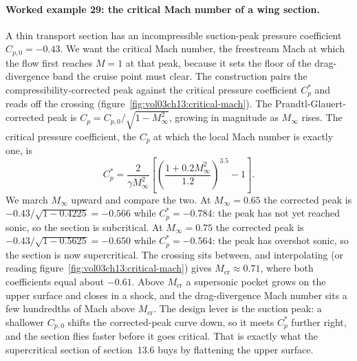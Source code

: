 \paragraph{Worked example 29: the critical Mach number of a wing
section.} A thin transport section has an incompressible suction-peak
pressure coefficient $C_{p,0} = -0.43$. We want the critical Mach
number, the freestream Mach at which the flow first reaches $M = 1$ at
that peak, because it sets the floor of the drag-divergence band the
cruise point must clear. The construction pairs the
compressibility-corrected peak against the critical pressure
coefficient $C_p^*$ and reads off the crossing
(figure~\ref{fig:vol03ch13:critical-mach}). The Prandtl-Glauert-corrected
peak is $C_p = C_{p,0}/\sqrt{1 - M_\infty^2}$, growing in magnitude as
$M_\infty$ rises. The critical pressure coefficient, the $C_p$ at which
the local Mach number is exactly one, is
\[
C_p^* = \frac{2}{\gamma M_\infty^2}\left[\left(\frac{1 + 0.2
M_\infty^2}{1.2}\right)^{3.5} - 1\right].
\]
We march $M_\infty$ upward and compare the two. At $M_\infty = 0.65$ the
corrected peak is $-0.43/\sqrt{1 - 0.4225} = -0.566$ while
$C_p^* = -0.784$: the peak has not yet reached sonic, so the section is
subcritical. At $M_\infty = 0.75$ the corrected peak is
$-0.43/\sqrt{1 - 0.5625} = -0.650$ while $C_p^* = -0.564$: the peak has
overshot sonic, so the section is now supercritical. The crossing sits
between, and interpolating (or reading
figure~\ref{fig:vol03ch13:critical-mach}) gives
$M_{\mathrm{cr}} \approx 0.71$, where both coefficients equal about
$-0.61$. Above $M_{\mathrm{cr}}$ a supersonic pocket grows on the upper
surface and closes in a shock, and the drag-divergence Mach number sits
a few hundredths of Mach above $M_{\mathrm{cr}}$. The design lever is
the suction peak: a shallower $C_{p,0}$ shifts the corrected-peak curve
down, so it meets $C_p^*$ further right, and the section flies faster
before it goes critical. That is exactly what the supercritical section
of section~13.6 buys by flattening the upper surface.



